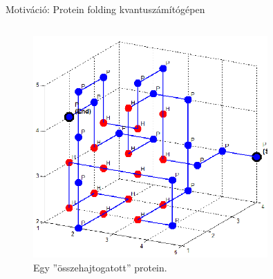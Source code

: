\documentclass[aspectratio=169]{beamer}
\begin{document}
\begin{frame}{Motiváció: Protein folding kvantuszámítógépen}
\begin{columns}
\begin{column}{0.55\textwidth}
\begin{figure}[H]
\center
\includegraphics[width=0.8\textwidth]{./figures/Protein-folds-with-length-36-amino-acids-18-contacts.png}
\caption{Egy ''összehajtogatott'' protein.}
\end{figure}
\end{column}
\end{columns}

\end{frame}
\end{document}
